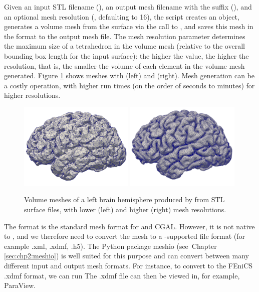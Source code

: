 \noindent Given an input STL filename (), an
output mesh filename with the  suffix
(), and an optional mesh resolution
(, defaulting to 16), the script creates an
\svmtk{}  object, generates a volume mesh from the
surface via the call to , and saves this
mesh in the  format to the output mesh file. The
mesh resolution parameter determines the maximum size of a tetrahedron
in the volume mesh (relative to the overall bounding box length for
the input surface): the higher the value, the higher the resolution,
that is, the smaller the volume of each element in the volume mesh
generated. Figure \ref{fig:chp3:ernie-volume-mesh} shows meshes with
 (left) and  (right). Mesh generation can be a costly operation, with higher
run times (on the order of seconds to minutes) for higher resolutions.
\begin{figure}
  \includegraphics[width=0.49\textwidth]{./graphics/chp3/ernie-volume-16-r.png}
  \includegraphics[width=0.49\textwidth]{./graphics/chp3/ernie-volume-64-r.png}
  \caption{Volume meshes of a left brain hemisphere produced by
    {\svmtk} from STL surface files, with lower (left) and higher
    (right) mesh resolutions.}
  \label{fig:chp3:ernie-volume-mesh}
\end{figure}

The  format is the standard mesh format for \svmtk{} and
CGAL. However, it is not native to \fenics{}, and we therefore need to
convert the mesh to a \fenics-supported file format (for example .xml, .xdmf,
.h5). The Python package meshio (see~Chapter
\ref{sec:chp2:meshio}) is well suited for this purpose and can
convert between many different input and output mesh formats. For
instance, to convert to the FEniCS .xdmf format, we can run
\noindent The .xdmf file can then be viewed in, for example, ParaView.


